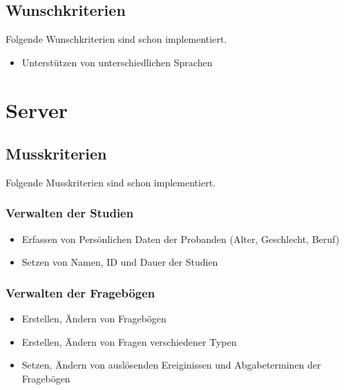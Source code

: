 \documentclass[a4paper]{scrreprt}
\begin{document}
        \subsection{Wunschkriterien}
        \par
        Folgende Wunschkriterien sind schon implementiert. 
                \begin{itemize}
                    \item Unterst\"utzen von unterschiedlichen Sprachen
                \end{itemize}
                \vspace*{0.5cm}
                




        \section{Server}
        \subsection{Musskriterien}
                \par
                Folgende Musskriterien sind schon implementiert.
                        \subsubsection{Verwalten der Studien}
                            \begin{itemize}
                                \item Erfassen von Pers\"onlichen Daten der Probanden (Alter, Geschlecht, Beruf)
                                \item Setzen von Namen, ID und Dauer der Studien
                            \end{itemize}
                        \subsubsection{Verwalten der Frageb\"ogen}
                            \begin{itemize}
                                \item Erstellen, \"Andern von Frageb\"ogen
                                \item Erstellen, \"Andern von Fragen verschiedener Typen
                                \item Setzen, \"Andern von ausl\"osenden Ereiginissen und Abgabeterminen der Frageb\"ogen
                            \end{itemize}
\end{document}
